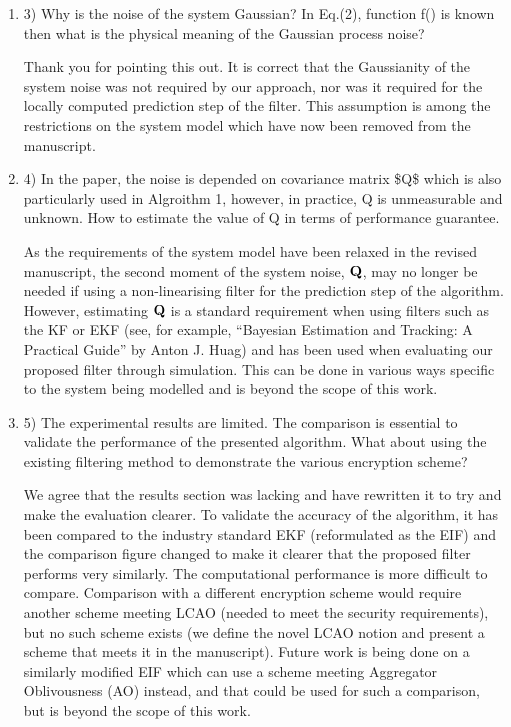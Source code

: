 \documentclass[a4paper]{scrartcl}
\newenvironment{rebuttal}{\begin{enumerate}[label={\color{grey}\thesection.\arabic{enumi}},leftmargin=0pt,ref=\thesection.\arabic{enumi}]}{\end{enumerate}}
\newcommand{\reviewtext}[1]{{\color{nblue} #1}}
\begin{document}
\begin{rebuttal}
\item \reviewtext{3) Why is the noise of the system Gaussian? In Eq.(2), function f() is known then what is the physical meaning of the Gaussian process noise?}

Thank you for pointing this out. It is correct that the Gaussianity of the system noise was not required by our approach, nor was it required for the locally computed prediction step of the filter. This assumption is among the restrictions on the system model which have now been removed from the manuscript.

\item \reviewtext{4) In the paper, the noise is depended on covariance matrix \$Q\$ which is also particularly used in Algroithm 1, however, in practice, Q is unmeasurable and unknown. How to estimate the value of Q in terms of performance guarantee.}

As the requirements of the system model have been relaxed in the revised manuscript, the second moment of the system noise, ${{\mathbf{Q}}}$, may no longer be needed if using a non-linearising filter for the prediction step of the algorithm. However, estimating ${{\mathbf{Q}}}$ is a standard requirement when using filters such as the KF or EKF (see, for example, ``Bayesian Estimation and Tracking: A Practical Guide'' by Anton J. Huag) and has been used when evaluating our proposed filter through simulation. This can be done in various ways specific to the system being modelled and is beyond the scope of this work.

\item \reviewtext{5) The experimental results are limited. The comparison is essential to validate the performance of the presented algorithm. What about using the existing filtering method to demonstrate the various encryption scheme?}

We agree that the results section was lacking and have rewritten it to try and make the evaluation clearer. To validate the accuracy of the algorithm, it has been compared to the industry standard EKF (reformulated as the EIF) and the comparison figure changed to make it clearer that the proposed filter performs very similarly. The computational performance is more difficult to compare. Comparison with a different encryption scheme would require another scheme meeting LCAO (needed to meet the security requirements), but no such scheme exists (we define the novel LCAO notion and present a scheme that meets it in the manuscript). Future work is being done on a similarly modified EIF which can use a scheme meeting Aggregator Oblivousness (AO) instead, and that could be used for such a comparison, but is beyond the scope of this work.


\end{rebuttal}
\end{document}
